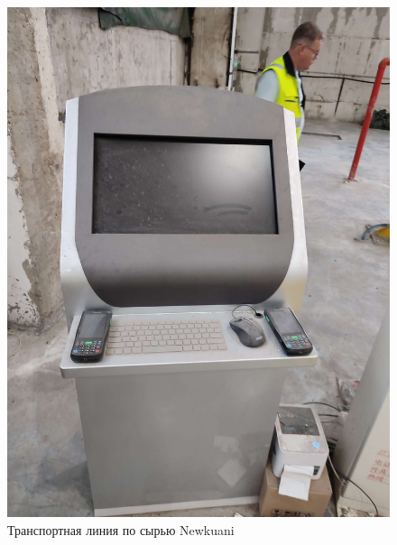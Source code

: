 \begin{figure}
\begin{center}
  \includegraphics[height=0.4\textheight, width=\textwidth, keepaspectratio]{Pics/d_Newkuani_5.JPEG}
\end{center}
  \caption{Транспортная линия по сырью Newkuani}
  \label{pic:d_Newkuani_5}
\end{figure}

